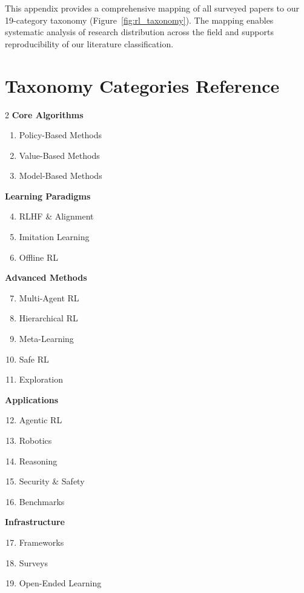 \documentclass[12pt,a4paper]{report}
\theoremstyle{definition}
\begin{document}
This appendix provides a comprehensive mapping of all surveyed papers to our 19-category taxonomy (Figure~\ref{fig:rl_taxonomy}). The mapping enables systematic analysis of research distribution across the field and supports reproducibility of our literature classification.

\section*{Taxonomy Categories Reference}
\begin{multicols}{2}
\footnotesize
\noindent\textbf{Core Algorithms}
\begin{enumerate}
\item Policy-Based Methods
\item Value-Based Methods
\item Model-Based Methods
\end{enumerate}

\noindent\textbf{Learning Paradigms}
\begin{enumerate}
\setcounter{enumi}{3}
\item RLHF \& Alignment
\item Imitation Learning
\item Offline RL
\end{enumerate}

\noindent\textbf{Advanced Methods}
\begin{enumerate}
\setcounter{enumi}{6}
\item Multi-Agent RL
\item Hierarchical RL
\item Meta-Learning
\item Safe RL
\item Exploration
\end{enumerate}

\columnbreak
\noindent\textbf{Applications}
\begin{enumerate}
\setcounter{enumi}{11}
\item Agentic RL
\item Robotics
\item Reasoning
\item Security \& Safety
\item Benchmarks
\end{enumerate}

\noindent\textbf{Infrastructure}
\begin{enumerate}
\setcounter{enumi}{16}
\item Frameworks
\item Surveys
\item Open-Ended Learning
\end{enumerate}
\end{multicols}
\end{document}
